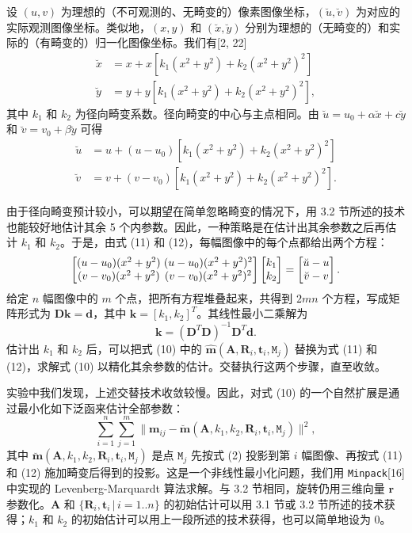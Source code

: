 \documentclass[a4paper,twocolumn,zihao=5,fontset=none,UTF8]{ctexart}
\newcommand{\A}{\mathbf{A}}
\newcommand{\R}{\mathbf{R}}
\newcommand{\rr}{\mathbf{r}}
\newcommand{\tv}{\mathbf{t}}
\newcommand{\m}{\mathbf{m}}
\newcommand{\M}{\mathtt{M}}
\begin{document}
设 $(u,v)$ 为理想的（不可观测的、无畸变的）像素图像坐标，$(\breve u,\breve v)$ 为对应的实际观测图像坐标。类似地，$(x,y)$ 和 $(\breve x,\breve y)$ 分别为理想的（无畸变的）和实际的（有畸变的）归一化图像坐标。我们有[2, 22]
\begin{equation*}
\begin{aligned}
  \breve x&=x+x[k_1(x^2+y^2)+k_2(x^2+y^2)^2]\\
  \breve y&=y+y[k_1(x^2+y^2)+k_2(x^2+y^2)^2],
\end{aligned}
\end{equation*}
其中 $k_1$ 和 $k_2$ 为径向畸变系数。径向畸变的中心与主点相同。由 $\breve u=u_0+\alpha\breve x+c\breve y$ 和 $\breve v=v_0+\beta\breve y$ 可得
\begin{align}
  \breve u&=u+(u-u_0)[k_1(x^2+y^2)+k_2(x^2+y^2)^2]\\
  \breve v&=v+(v-v_0)[k_1(x^2+y^2)+k_2(x^2+y^2)^2].
\end{align}

由于径向畸变预计较小，可以期望在简单忽略畸变的情况下，用 3.2 节所述的技术也能较好地估计其余 5 个内参数。因此，一种策略是在估计出其余参数之后再估计 $k_1$ 和 $k_2$。于是，由式 (11) 和 (12)，每幅图像中的每个点都给出两个方程：
\begin{equation*}
  \setlength{\arraycolsep}{1.5pt}
  \begin{bmatrix}(u-u_0)(x^2+y^2) & (u-u_0)(x^2+y^2)^2\\ (v-v_0)(x^2+y^2) & (v-v_0)(x^2+y^2)^2\end{bmatrix}
  \begin{bmatrix}k_1\\ k_2\end{bmatrix}
  =\begin{bmatrix}\breve u-u\\ \breve v-v\end{bmatrix}.
\end{equation*}
给定 $n$ 幅图像中的 $m$ 个点，把所有方程堆叠起来，共得到 $2mn$ 个方程，写成矩阵形式为 $\mathbf{D}\mathbf{k}=\mathbf{d}$，其中 $\mathbf{k}=[k_1,k_2]^T$。其线性最小二乘解为
\begin{equation}
  \mathbf{k}=(\mathbf{D}^T\mathbf{D})^{-1}\mathbf{D}^T\mathbf{d}.
\end{equation}
估计出 $k_1$ 和 $k_2$ 后，可以把式 (10) 中的 $\hat{\m}(\A,\R_i,\tv_i,\M_j)$ 替换为式 (11) 和 (12)，求解式 (10) 以精化其余参数的估计。交替执行这两个步骤，直至收敛。

实验中我们发现，上述交替技术收敛较慢。因此，对式 (10) 的一个自然扩展是通过最小化如下泛函来估计全部参数：
\begin{equation}
  \sum_{i=1}^{n}\sum_{j=1}^{m}\bigl\|\m_{ij}-\breve{\m}(\A,k_1,k_2,\R_i,\tv_i,\M_j)\bigr\|^2,
\end{equation}
其中 $\breve{\m}(\A,k_1,k_2,\R_i,\tv_i,\M_j)$ 是点 $\M_j$ 先按式 (2) 投影到第 $i$ 幅图像、再按式 (11) 和 (12) 施加畸变后得到的投影。这是一个非线性最小化问题，我们用 \texttt{Minpack}[16] 中实现的 Levenberg-Marquardt 算法求解。与 3.2 节相同，旋转仍用三维向量 $\rr$ 参数化。$\A$ 和 $\{\R_i,\tv_i\,|\,i=1..n\}$ 的初始估计可以用 3.1 节或 3.2 节所述的技术获得；$k_1$ 和 $k_2$ 的初始估计可以用上一段所述的技术获得，也可以简单地设为 0。
\end{document}
